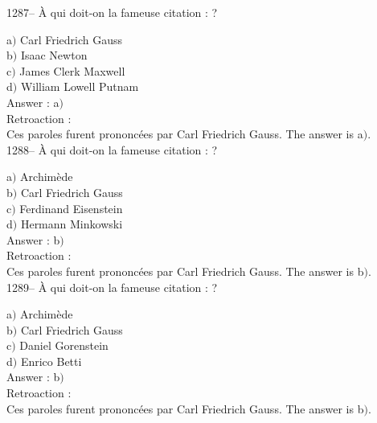 ﻿\documentclass[letterpaper, 12pt]{article}
\begin{document}
1287-- \`A qui doit-on la fameuse citation : \fg?

a$)$ Carl Friedrich Gauss \\
b$)$ Isaac Newton \\
c$)$ James Clerk Maxwell \\
d$)$ William Lowell Putnam\\

Answer : a$)$\\

Retroaction : \\
Ces paroles furent prononc\'ees par Carl Friedrich Gauss.
The answer is  a$)$.\\

1288-- \`A qui doit-on la fameuse citation : \fg ?

a$)$ Archim\`ede \\
b$)$ Carl Friedrich Gauss \\
c$)$ Ferdinand Eisenstein \\
d$)$ Hermann Minkowski\\

Answer : b$)$\\

Retroaction : \\
Ces paroles furent prononc\'ees par Carl Friedrich Gauss.
The answer is  b$)$.\\

1289-- \`A qui doit-on la fameuse citation : \fg ?

a$)$ Archim\`ede \\
b$)$ Carl Friedrich Gauss \\
c$)$ Daniel Gorenstein \\
d$)$ Enrico Betti\\

Answer : b$)$\\

Retroaction : \\
Ces paroles furent prononc\'ees par Carl Friedrich Gauss.
The answer is  b$)$.\\
\end{document}
